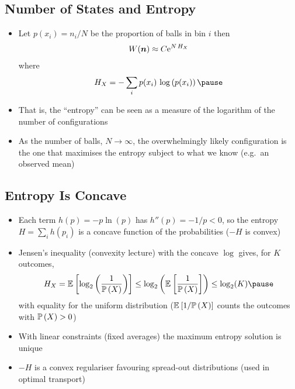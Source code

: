 
\begin{slide}
\section[-2]{Number of States and Entropy}
  
\begin{PauseHighLight}
  \begin{itemize}
  \item Let $p(x_i) = n_i/N$ be the proportion of balls in bin $i$ then
    \begin{align*}
      W(\bm{n}) \approx C {\rm e}^{N\,H_X}
    \end{align*}
    where
    \begin{align*}
      H_X = -\sum_{i} p(x_i)\, \logg{p(x_i)}\pause
    \end{align*}
  \item That is, the ``entropy'' can be seen as a measure of the
    logarithm of the number of configurations\pause
  \item As the number of balls, $N\rightarrow\infty$, the
    overwhelmingly likely configuration is the one that maximises the
    entropy subject to what we know (e.g.\ an observed mean)\pause
  \end{itemize}
\end{PauseHighLight}

\end{slide}


\begin{slide}
\section[-2]{Entropy Is Concave}

\begin{PauseHighLight}
  \begin{itemize}\squeeze
  \item Each term $h(p) = -p\ln(p)$ has $h''(p) = -1/p < 0$, so the
    entropy $H = \sum_i h(p_i)$ is a concave function of the
    probabilities\pause{} ($-H$ is convex)\pauseb
  \item Jensen's inequality (convexity lecture) with the concave
    $\log$ gives, for $K$ outcomes,
    \begin{align*}
      H_X = \av{\logtwo{\frac{1}{\Prob{X}}}} \leq
      \logtwo{\av{\frac{1}{\Prob{X}}}} \leq \log_2(K)\pause
    \end{align*}
    with equality for the uniform distribution\pause{} {\small
    ($\mathbb{E}_{}\left[ 1/\mathbb{P}\left( X \right) \right]$ counts the outcomes with $\mathbb{P}\left( X \right)>0$)}\pauseb
  \item With linear constraints (fixed averages) the maximum entropy
    solution is unique\pause
  \item $-H$ is a convex regulariser favouring spread-out
    distributions (used in optimal transport)\pause
  \end{itemize}
\end{PauseHighLight}

\end{slide}

